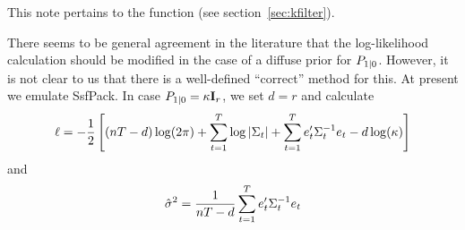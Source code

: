 \documentclass[a4paper]{article}
\begin{document}
This note pertains to the  function (see
section~\ref{sec:kfilter}). 

There seems to be general agreement in the literature that the
log-likelihood calculation should be modified in the case of a diffuse
prior for $P_{1|0}$.  However, it is not clear to us that
there is a well-defined ``correct'' method for this.  At present we
emulate \textsf{SsfPack}.  In case
$P_{1|0} = \kappa \mathbf{I}_r$, we set $d = r$ and calculate
%
\[
  \ell = -\frac{1}{2} \left[(nT-d) \log(2 \pi) + 
    \sum_{t=1}^T\log \left|\Sigma_t\right| + 
    \sum_{t=1}^Te_t'\Sigma_t^{-1} e_t
    - d \log(\kappa)
  \right]
\]
%
and
%
\[
\hat{\sigma}^2 = \frac{1}{nT-d} 
   \sum_{t=1}^Te_t'\Sigma_t^{-1} e_t
\]
 
\end{document}
